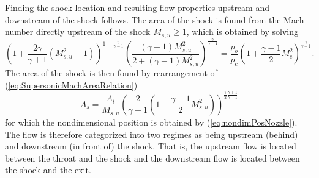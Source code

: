 \documentclass[11pt,dvipsnames]{thesis}
\begin{document}
Finding the shock location and resulting flow properties upstream and downstream of the shock follows. The area of the shock is found from the Mach number directly upstream of the shock $M_{s,u} \geqslant 1$, which is obtained by solving
\begin{equation}
\left(1 + \frac{2\gamma}{\gamma + 1}(M_{s,u}^2 - 1)\right)^{\!1 - \frac{\gamma}{\gamma - 1}} \left(\frac{(\gamma + 1)M_{s,u}^2}{2 + (\gamma - 1)M_{s,u}^2}\right)^{\!\frac{\gamma}{\gamma - 1}} = \frac{p_b}{p_c}\left(1 + \frac{\gamma - 1}{2} M_e^2\right)^{\!\frac{\gamma}{\gamma - 1}}.
\end{equation}
The area of the shock is then found by rearrangement of (\ref{eq:SupersonicMachAreaRelation})
\begin{equation}
A_s = \frac{A_t}{M_{s,u}}\left(\frac{2}{\gamma + 1} \left(1 + \frac{\gamma - 1}{2} M_{s,u}^2\right)\right)^{\!\frac{1}{2}\frac{\gamma + 1}{\gamma - 1}}
\end{equation}
for which the nondimensional position is obtained by (\ref{eq:nondimPosNozzle}). The flow is therefore categorized into two regimes as being upstream (behind) and downstream (in front of) the shock. That is, the upstream flow is located between the throat and the shock and the downstream flow is located between the shock and the exit.
\end{document}
